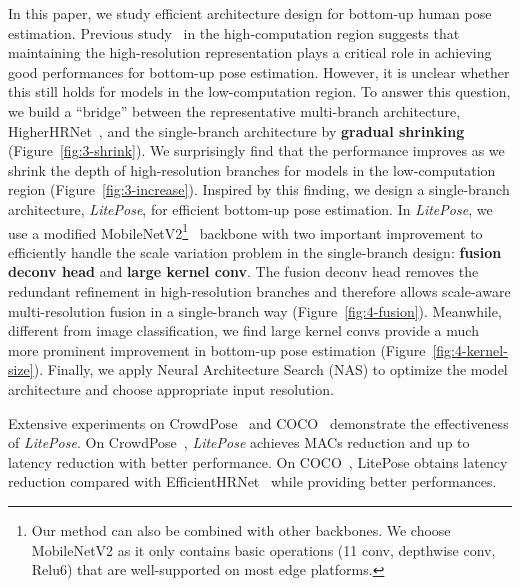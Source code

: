 \documentclass[10pt,twocolumn,letterpaper]{article}
\begin{document}
In this paper, we study efficient architecture design for bottom-up human pose estimation. Previous study~\cite{cheng2020higherhrnet,geng2021bottom} in the high-computation region suggests that maintaining the high-resolution representation plays a critical role in achieving good performances for bottom-up pose estimation. However, it is unclear whether this still holds for models in the low-computation region. To answer this question, we build a ``bridge'' between the representative multi-branch architecture, HigherHRNet~\cite{cheng2020higherhrnet}, and the single-branch architecture by \textbf{gradual shrinking} (Figure~\ref{fig:3-shrink}). We surprisingly find that the performance improves as we shrink the depth of high-resolution branches for models in the low-computation region (Figure~\ref{fig:3-increase}). Inspired by this finding, we design a single-branch architecture, \textit{LitePose}, for efficient bottom-up pose estimation. In \textit{LitePose}, we use a modified MobileNetV2\footnote{Our method can also be combined with other backbones. We choose MobileNetV2 as it only contains basic operations (11 conv, depthwise conv, Relu6) that are well-supported on most edge platforms.}~\cite{sandler2018mobilenetv2} backbone with two important improvement to efficiently handle the scale variation problem in the single-branch design: \textbf{fusion deconv head} and \textbf{large kernel conv}. The fusion deconv head removes the redundant refinement in high-resolution branches and therefore allows scale-aware multi-resolution fusion in a single-branch way (Figure~\ref{fig:4-fusion}). Meanwhile, different from image classification, we find large kernel convs provide a much more prominent improvement in bottom-up pose estimation (Figure~\ref{fig:4-kernel-size}). Finally, we apply Neural Architecture Search (NAS) to optimize the model architecture and choose appropriate input resolution.

Extensive experiments on CrowdPose~\cite{li2019crowdpose} and COCO~\cite{lin2014microsoft} demonstrate the effectiveness of \textit{LitePose}. On CrowdPose~\cite{li2019crowdpose}, \textit{LitePose} achieves  MACs reduction and up to  latency reduction with better performance. On COCO~\cite{lin2014microsoft}, LitePose obtains  latency reduction compared with EfficientHRNet~\cite{neff2020efficienthrnet} while providing better performances. 

\noindent
\end{document}

